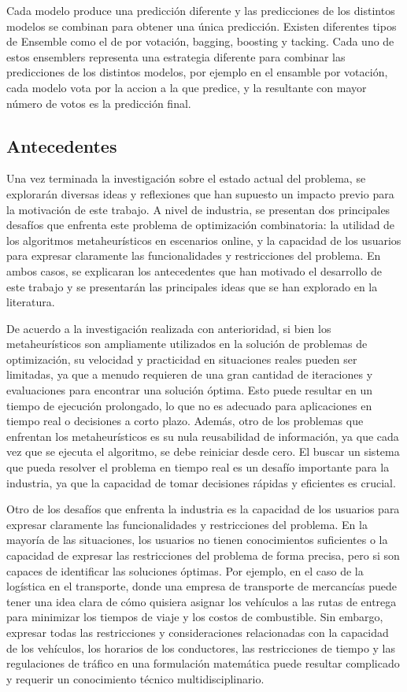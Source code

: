 Cada modelo produce una predicción diferente y las predicciones de los distintos modelos se combinan 
para obtener una única predicción. Existen diferentes tipos de Ensemble como el de por votación, bagging, 
boosting y tacking. Cada uno de estos ensemblers representa una estrategia diferente para combinar las 
predicciones de los distintos modelos, por ejemplo en el ensamble por votación, cada modelo vota por 
la accion a la que predice, y la resultante con mayor número de votos es la predicción final.

\subsection{Antecedentes}
Una vez terminada la investigación sobre el estado actual del problema, se explorarán diversas ideas 
y reflexiones que han supuesto un impacto previo para la motivación de este trabajo. A nivel de industria, se 
presentan dos principales desafíos que enfrenta este problema de optimización combinatoria: la utilidad de los 
algoritmos metaheurísticos en escenarios online, y la capacidad de los usuarios para expresar claramente las 
funcionalidades y restricciones del problema. En ambos casos, se explicaran los antecedentes que han motivado
el desarrollo de este trabajo y se presentarán las principales ideas que se han explorado en la literatura.\medskip

De acuerdo a la investigación realizada con anterioridad, si bien los metaheurísticos son ampliamente utilizados 
en la solución de problemas de optimización, su velocidad y practicidad en situaciones reales pueden ser limitadas, 
ya que a menudo requieren de una gran cantidad de iteraciones y evaluaciones para encontrar una solución óptima. 
Esto puede resultar en un tiempo de ejecución prolongado, lo que no es adecuado para aplicaciones en tiempo real 
o decisiones a corto plazo. Además, otro de los problemas que enfrentan los metaheurísticos es su nula 
reusabilidad de información, ya que cada vez que se ejecuta el algoritmo, se debe reiniciar desde cero.
El buscar un sistema que pueda resolver el problema en tiempo real es un desafío importante para la 
industria, ya que la capacidad de tomar decisiones rápidas y eficientes es crucial.\medskip 

Otro de los desafíos que enfrenta la industria es la capacidad de los usuarios para expresar claramente las
funcionalidades y restricciones del problema. En la mayoría de las situaciones, los usuarios no tienen conocimientos
suficientes o la capacidad de expresar las restricciones del problema de forma precisa, pero si son capaces de
identificar las soluciones óptimas. Por ejemplo, en el caso de la logística en el transporte, donde una empresa 
de transporte de mercancías puede tener una idea clara de cómo quisiera asignar los vehículos a las rutas de 
entrega para minimizar los tiempos de viaje y los costos de combustible. Sin embargo, expresar todas las 
restricciones y consideraciones relacionadas con la capacidad de los vehículos, los horarios de los conductores, 
las restricciones de tiempo y las regulaciones de tráfico en una formulación matemática puede resultar complicado 
y requerir un conocimiento técnico multidisciplinario.\medskip

